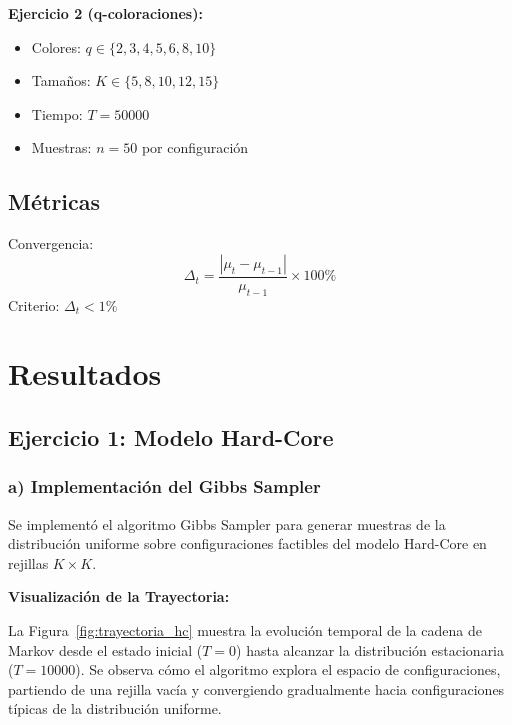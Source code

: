 \textbf{Ejercicio 2 (q-coloraciones):}
\begin{itemize}
    \item Colores: $q \in \{2, 3, 4, 5, 6, 8, 10\}$
    \item Tamaños: $K \in \{5, 8, 10, 12, 15\}$
    \item Tiempo: $T = 50000$
    \item Muestras: $n = 50$ por configuración
\end{itemize}

\subsection{Métricas}

Convergencia:
\begin{equation}
\Delta_t = \frac{|\mu_t - \mu_{t-1}|}{\mu_{t-1}} \times 100\%
\end{equation}
Criterio: $\Delta_t < 1\%$

\clearpage
\section{Resultados}

\subsection{Ejercicio 1: Modelo Hard-Core}

\subsubsection{a) Implementación del Gibbs Sampler}

Se implementó el algoritmo Gibbs Sampler para generar muestras de la distribución uniforme sobre configuraciones factibles del modelo Hard-Core en rejillas $K \times K$.

\textbf{Visualización de la Trayectoria:}

La Figura~\ref{fig:trayectoria_hc} muestra la evolución temporal de la cadena de Markov desde el estado inicial ($T=0$) hasta alcanzar la distribución estacionaria ($T=10000$). Se observa cómo el algoritmo explora el espacio de configuraciones, partiendo de una rejilla vacía y convergiendo gradualmente hacia configuraciones típicas de la distribución uniforme.

